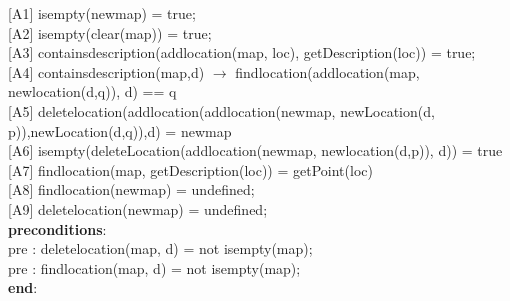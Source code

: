 \documentclass[12pt]{article}
\begin{document}
\begin{spacing}{1.5}
\hspace*{5mm} [A1] isempty(newmap) = true;\\
\hspace*{5mm} [A2] isempty(clear(map)) = true;\\
\hspace*{5mm} [A3] containsdescription(addlocation(map, loc), getDescription(loc)) = true;\\
\hspace*{5mm} [A4] containsdescription(map,d) $\rightarrow$ findlocation(addlocation(map, newlocation(d,q)), d) == q \\
\hspace*{5mm} [A5] deletelocation(addlocation(addlocation(newmap, newLocation(d, p)),newLocation(d,q)),d) = newmap\\
\hspace*{5mm} [A6] isempty(deleteLocation(addlocation(newmap, newlocation(d,p)), d)) = true \\
\hspace*{5mm} [A7] findlocation(map, getDescription(loc)) = getPoint(loc)\\
\hspace*{5mm} [A8] findlocation(newmap) = undefined;\\
\hspace*{5mm} [A9] deletelocation(newmap) = undefined;\\
\hspace*{5mm} \textbf{preconditions}:\\
\hspace*{10mm} pre : deletelocation(map, d) = not isempty(map);\\
\hspace*{10mm} pre : findlocation(map, d) = not isempty(map);\\
\hspace*{5mm} \textbf{end}:\\

\end{spacing}
\end{document}

